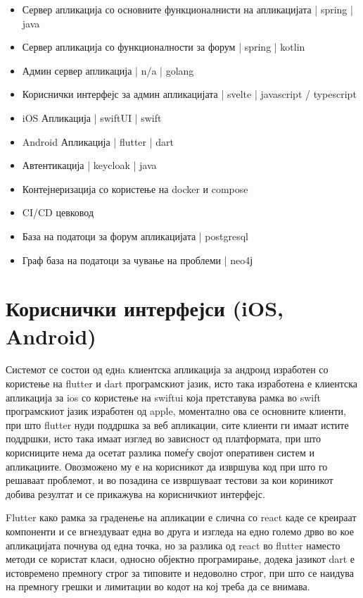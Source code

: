 \documentclass{article}
\begin{document}
\begin{itemize}
\item Сервер апликација со основните функционалнисти на апликацијата  |  spring  |  java
\item Сервер апликација со функционалности за форум  |  spring  |  kotlin
\item Админ сервер апликација  |  n/a  |  golang
\item Кориснички интерфејс за админ апликацијата  |  svelte  |  javascript / typescript
\item iOS Апликација  |  swiftUI  |  swift
\item Android Апликација |  flutter  |  dart
\item Автентикација  |  keycloak  |  java
\item Контејнеризација со користење на docker и compose
\item CI/CD цевковод
\item База на податоци за форум апликацијата  |  postgresql
\item Граф база на податоци за чување на проблеми  |  neo4ј
\end{itemize}

\section{Кориснички интерфејси (iOS, Android)}

Системот се состои од еднa клиентска апликација за андроид изработен со користење на flutter и dart програмскиот јазик, исто така изработена е клиентска апликација за ios со користење на swiftui која претставува рамка во swift програмскиот јазик изработен од apple, моментално ова се основните клиенти, при што flutter нуди поддршка за веб апликации, сите клиенти ги имаат истите поддршки, исто така имаат изглед во зависност од платформата, при што корисниците нема да осетат разлика помеѓу својот оперативен систем и апликациите. Овозможено му е на корисникот да извршува код при што го решаваат проблемот, и во позадина се извршуваат тестови за кои кориникот добива резултат и се прикажува на корисничкиот интерфејс.

Flutter како рамка за граденење на апликации е слична со react каде се креираат компоненти и се вгнездуваат една во друга и изгледа на едно големо дрво во кое апликацијата почнува од една точка, но за разлика од react во flutter наместо методи се користат класи, односно објектно програмирање, додека јазикот dart е истовремено премногу строг за типовите и недоволно строг, при што се наидува на премногу грешки и лимитации во кодот на кој треба да се внимава.
\end{document}
